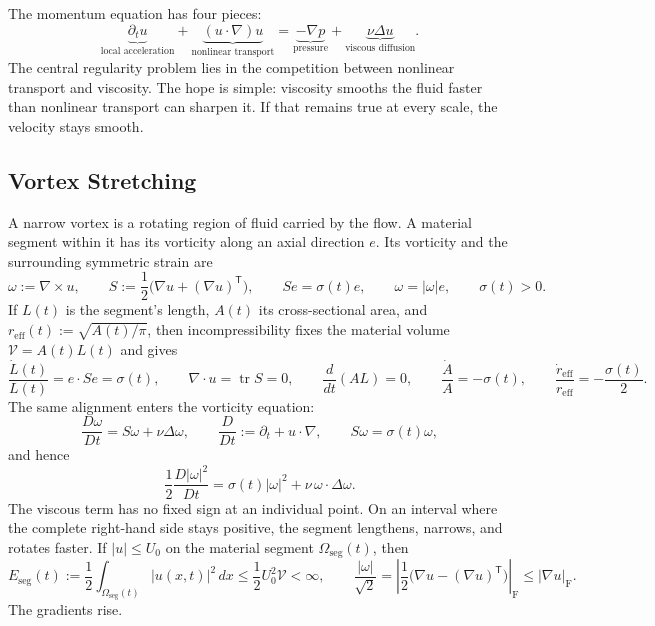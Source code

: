 
The momentum equation has four pieces:
\[
  \underbrace{\partial_t u}_{\text{local acceleration}}
  +
  \underbrace{(u\cdot\nabla)u}_{\text{nonlinear transport}}
  =
  \underbrace{-\nabla p}_{\text{pressure}}
  +
  \underbrace{\nu\Delta u}_{\text{viscous diffusion}}.
\]
The central regularity problem lies in the competition between nonlinear transport and viscosity.
The hope is simple: viscosity smooths the fluid faster than nonlinear transport can sharpen it.
If that remains true at every scale, the velocity stays smooth.

\subsection{Vortex Stretching}\label{sub:ThePerfectlyStretchingVortex}

A narrow vortex is a rotating region of fluid carried by the flow.
A material segment within it has its vorticity along an axial direction \(e\).
Its vorticity and the surrounding symmetric strain are
\[
  \omega:=\nabla\times u,
  \qquad
  S:=\frac12\bigl(\nabla u+(\nabla u)^{\mathsf T}\bigr),
  \qquad
  Se=\sigma(t)e,
  \qquad
  \omega=|\omega|e,
  \qquad
  \sigma(t)>0.
\]
If \(L(t)\) is the segment's length, \(A(t)\) its cross-sectional area, and
\(r_{\mathrm{eff}}(t):=\sqrt{A(t)/\pi}\), then incompressibility fixes the
material volume \(\mathcal V=A(t)L(t)\) and gives
\[
  \frac{\dot L(t)}{L(t)}
  =
  e\cdot Se
  =
  \sigma(t),
  \qquad
  \nabla\cdot u=\operatorname{tr}S=0,
  \qquad
  \frac{d}{dt}(A L)=0,
  \qquad
  \frac{\dot A}{A}=-\sigma(t),
  \qquad
  \frac{\dot r_{\mathrm{eff}}}{r_{\mathrm{eff}}}
  =
  -\frac{\sigma(t)}{2}.
\]
The same alignment enters the vorticity equation:
\[
  \frac{D\omega}{Dt}
  =
  S\omega+\nu\Delta\omega,
  \qquad
  \frac{D}{Dt}:=\partial_t+u\cdot\nabla,
  \qquad
  S\omega=\sigma(t)\omega,
\]
and hence
\[
  \frac12\frac{D|\omega|^2}{Dt}
  =
  \sigma(t)|\omega|^2
  +
  \nu\,\omega\cdot\Delta\omega.
\]
The viscous term has no fixed sign at an individual point.
On an interval where the complete right-hand side stays positive, the segment lengthens, narrows, and rotates faster.
If \(|u|\leq U_0\) on the material segment \(\Omega_{\mathrm{seg}}(t)\), then
\[
  E_{\mathrm{seg}}(t)
  :=
  \frac12\int_{\Omega_{\mathrm{seg}}(t)}|u(x,t)|^2\,dx
  \leq
  \frac12U_0^2\mathcal V
  <
  \infty,
  \qquad
  \frac{|\omega|}{\sqrt2}
  =
  \left|\frac12\bigl(\nabla u-(\nabla u)^{\mathsf T}\bigr)\right|_{\mathrm F}
  \leq
  |\nabla u|_{\mathrm F}.
\]
The gradients rise.

